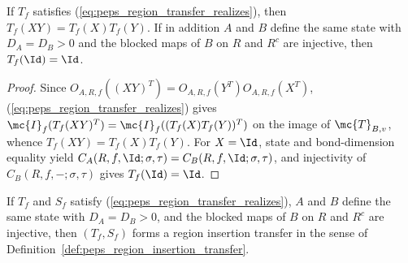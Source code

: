 \begin{lemma}
    \label{thm:peps_region_transfer_realized_maps}
    \leanok
    If $T_f$ satisfies (\ref{eq:peps_region_transfer_realizes}), then $T_f(XY)=T_f(X)T_f(Y)$. If in addition $A$ and $B$ define the same state with $D_A=D_B>0$ and the blocked maps of $B$ on $R$ and $R^c$ are injective, then $T_f(\Id)=\Id$.
\end{lemma}
\begin{proof}\leanok
    Since $O_{A,R,f}((XY)^T)=O_{A,R,f}(Y^T)O_{A,R,f}(X^T)$, (\ref{eq:peps_region_transfer_realizes}) gives $\mc{I}_f(T_f(XY)^T)=\mc{I}_f((T_f(X)T_f(Y))^T)$ on the image of $\mc{T}_{B,v}$, whence $T_f(XY)=T_f(X)T_f(Y)$. For $X=\Id$, state and bond-dimension equality yield $C_A(R,f,\Id;\sigma,\tau)=C_B(R,f,\Id;\sigma,\tau)$, and injectivity of $C_B(R,f,-;\sigma,\tau)$ gives $T_f(\Id)=\Id$.
\end{proof}

\begin{definition}
    \label{def:peps_region_insertion_transfer_of_realizes}
    \leanok
    If $T_f$ and $S_f$ satisfy (\ref{eq:peps_region_transfer_realizes}), $A$ and $B$ define the same state with $D_A=D_B>0$, and the blocked maps of $B$ on $R$ and $R^c$ are injective, then $(T_f,S_f)$ forms a region insertion transfer in the sense of Definition~\ref{def:peps_region_insertion_transfer}.
\end{definition}

